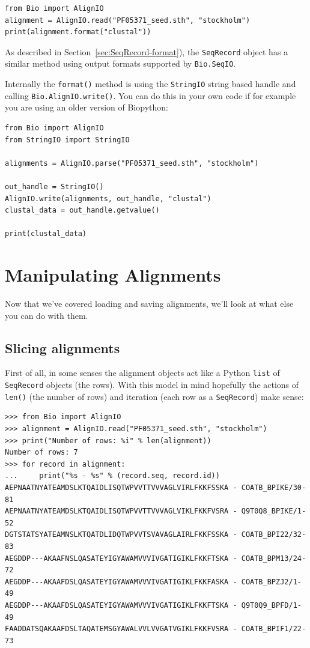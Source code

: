 \documentclass{report}
\begin{document}
\begin{verbatim}
from Bio import AlignIO
alignment = AlignIO.read("PF05371_seed.sth", "stockholm")
print(alignment.format("clustal"))
\end{verbatim}

As described in Section~\ref{sec:SeqRecord-format}), the \verb|SeqRecord| object has a similar method using output formats supported by \verb|Bio.SeqIO|.

Internally the \verb|format()| method is using the \verb|StringIO| string based handle and calling
\verb|Bio.AlignIO.write()|.  You can do this in your own code if for example you are using an
older version of Biopython:

\begin{verbatim}
from Bio import AlignIO
from StringIO import StringIO

alignments = AlignIO.parse("PF05371_seed.sth", "stockholm")

out_handle = StringIO()
AlignIO.write(alignments, out_handle, "clustal")
clustal_data = out_handle.getvalue()

print(clustal_data)
\end{verbatim}

\section{Manipulating Alignments}
\label{sec:manipulating-alignments}

Now that we've covered loading and saving alignments, we'll look at what else you can do
with them.

\subsection{Slicing alignments}
First of all, in some senses the alignment objects act like a Python \verb|list| of
\verb|SeqRecord| objects (the rows). With this model in mind hopefully the actions
of \verb|len()| (the number of rows) and iteration (each row as a \verb|SeqRecord|)
make sense:

\begin{verbatim}
>>> from Bio import AlignIO
>>> alignment = AlignIO.read("PF05371_seed.sth", "stockholm")
>>> print("Number of rows: %i" % len(alignment))
Number of rows: 7
>>> for record in alignment:
...     print("%s - %s" % (record.seq, record.id))
AEPNAATNYATEAMDSLKTQAIDLISQTWPVVTTVVVAGLVIRLFKKFSSKA - COATB_BPIKE/30-81
AEPNAATNYATEAMDSLKTQAIDLISQTWPVVTTVVVAGLVIKLFKKFVSRA - Q9T0Q8_BPIKE/1-52
DGTSTATSYATEAMNSLKTQATDLIDQTWPVVTSVAVAGLAIRLFKKFSSKA - COATB_BPI22/32-83
AEGDDP---AKAAFNSLQASATEYIGYAWAMVVVIVGATIGIKLFKKFTSKA - COATB_BPM13/24-72
AEGDDP---AKAAFDSLQASATEYIGYAWAMVVVIVGATIGIKLFKKFASKA - COATB_BPZJ2/1-49
AEGDDP---AKAAFDSLQASATEYIGYAWAMVVVIVGATIGIKLFKKFTSKA - Q9T0Q9_BPFD/1-49
FAADDATSQAKAAFDSLTAQATEMSGYAWALVVLVVGATVGIKLFKKFVSRA - COATB_BPIF1/22-73
\end{verbatim}
\end{document}
